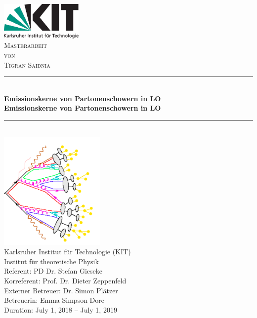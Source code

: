 \begin{titlepage}

\begin{center}


\includegraphics[width=0.3\textwidth]{images/Intro/kitlogo_de_rgb}\\[1cm]    

\textsc{\LARGE Masterarbeit}\\[0.5cm]
\textsc{\Large von}\\[0.5cm]
\textsc{\Large Tigran Saidnia}\\[1.0cm]


\newcommand{\HRule}{\rule{\linewidth}{0.5mm}}
\HRule \\[0.8mm]
{\textbf{\Large \bfseries Emissionskerne von Partonenschowern in LO}}\\[0.8mm]

{\textbf{\bfseries Emissionskerne von Partonenschowern in LO}}\\[0.8mm]

\HRule \\[1cm]
\includegraphics[scale=0.7]{images/Intro/footPicture.PNG}\\[0.8cm]   

\Large Karlsruher Institut für Technologie (KIT)\\[1.5mm]
\Large Institut für theoretische Physik\\[1.0cm]

{\Large Referent: PD Dr. Stefan Gieseke \\
\Large Korreferent: Prof. Dr. Dieter Zeppenfeld\\
\Large Externer Betreuer: Dr. Simon Plätzer\\
\Large Betreuerin: Emma Simpson Dore}\\[0.8cm]   

Duration: July 1, 2018  –  July 1, 2019

\vfill


\end{center}

\end{titlepage}